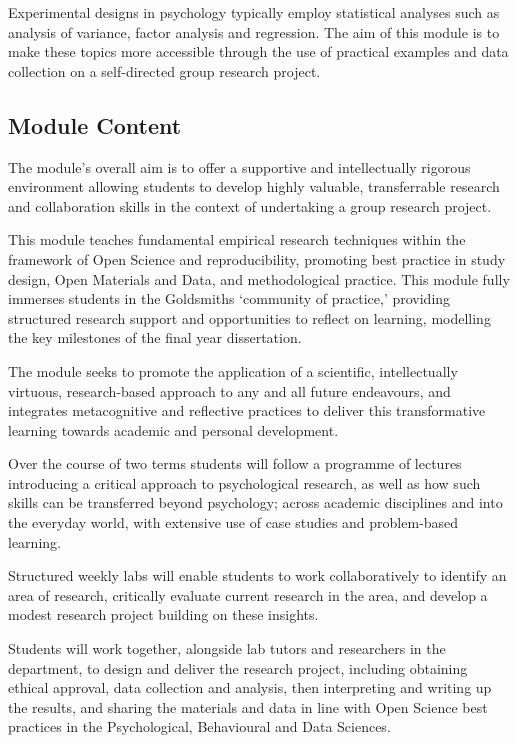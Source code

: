 \documentclass[
  11pt,
  letterpaper,
  oneside,
  open=any]{scrbook}
\begin{document}
Experimental designs in psychology typically employ statistical analyses
such as analysis of variance, factor analysis and regression. The aim of
this module is to make these topics more accessible through the use of
practical examples and data collection on a self-directed group research
project.

\hypertarget{module-content-1}{%
\subsection{Module Content}\label{module-content-1}}

The module's overall aim is to offer a supportive and intellectually
rigorous environment allowing students to develop highly valuable,
transferrable research and collaboration skills in the context of
undertaking a group research project.

This module teaches fundamental empirical research techniques within the
framework of Open Science and reproducibility, promoting best practice
in study design, Open Materials and Data, and methodological practice.
This module fully immerses students in the Goldsmiths `community of
practice,' providing structured research support and opportunities to
reflect on learning, modelling the key milestones of the final year
dissertation.

The module seeks to promote the application of a scientific,
intellectually virtuous, research-based approach to any and all future
endeavours, and integrates metacognitive and reflective practices to
deliver this transformative learning towards academic and personal
development.

Over the course of two terms students will follow a programme of
lectures introducing a critical approach to psychological research, as
well as how such skills can be transferred beyond psychology; across
academic disciplines and into the everyday world, with extensive use of
case studies and problem-based learning.

Structured weekly labs will enable students to work collaboratively to
identify an area of research, critically evaluate current research in
the area, and develop a modest research project building on these
insights.

Students will work together, alongside lab tutors and researchers in the
department, to design and deliver the research project, including
obtaining ethical approval, data collection and analysis, then
interpreting and writing up the results, and sharing the materials and
data in line with Open Science best practices in the Psychological,
Behavioural and Data Sciences.
\end{document}
